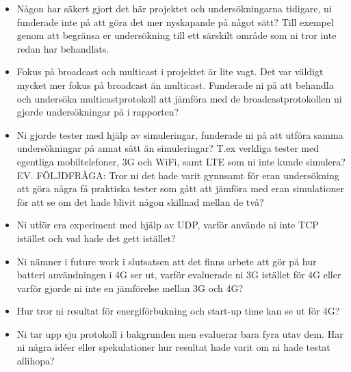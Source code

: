 \documentclass{article}
\begin{document}
\begin{itemize}
\item Någon har säkert gjort det här projektet och undersökningarna tidigare, ni funderade inte på att göra det mer nyskapande på något sätt? Till exempel genom att begränsa er undersökning till ett särskilt område som ni tror inte redan har behandlats.

\item Fokus på broadcast och multicast i projektet är lite vagt. Det var väldigt mycket mer fokus på broadcast än multicast. Funderade ni på att behandla och undersöka multicastprotokoll att jämföra med de broadcastprotokollen ni gjorde undersökningar på i rapporten?

\item Ni gjorde tester med hjälp av simuleringar, funderade ni på att utföra samma undersökningar på annat sätt än simuleringar? T.ex verkliga tester med egentliga mobiltelefoner, 3G och WiFi, samt LTE som ni inte kunde simulera? 
EV. FÖLJDFRÅGA: Tror ni det hade varit gynnsamt för eran undersökning att göra några få praktiska tester som gått att jämföra med eran simulationer för att se om det hade blivit någon skillnad mellan de två?

\item Ni utför era experiment med hjälp av UDP, varför använde ni inte TCP istället och vad hade det gett istället?

\item Ni nämner i future work i slutsatsen att det finns arbete att gör på hur batteri användningen i 4G ser ut, varför evaluerade ni 3G istället för 4G eller varför gjorde ni inte en jämförelse mellan 3G och 4G? 

\item Hur tror ni resultat för energiförbukning och start-up time kan se ut för 4G?

\item Ni tar upp sju protokoll i bakgrunden men evaluerar bara fyra utav dem. Har ni några idéer eller spekulationer hur resultat hade varit om ni hade testat allihopa?
\end{itemize}
\end{document}
